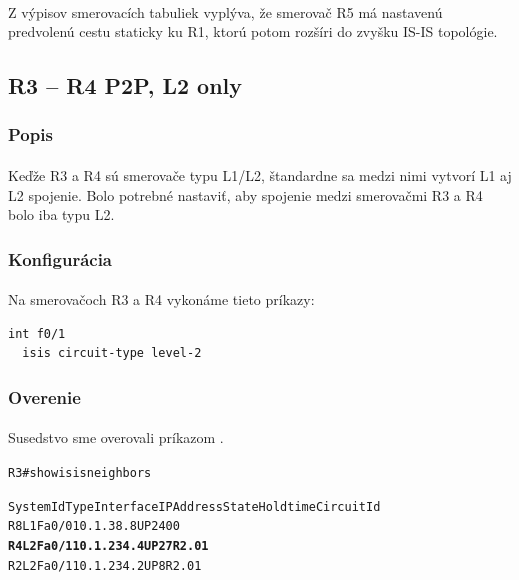 \documentclass[12pt,twoside,a4paper]{report}
\begin{document}
\paragraph{}
Z výpisov smerovacích tabuliek vyplýva, že smerovač R5 má nastavenú predvolenú cestu staticky ku R1, ktorú potom rozšíri do zvyšku IS-IS topológie.





\subsection{R3 – R4 P2P, L2 only}
\subsubsection{Popis}
\paragraph{}
Keďže R3 a R4 sú smerovače typu L1/L2, štandardne sa medzi nimi vytvorí L1 aj L2 spojenie. Bolo potrebné nastaviť, aby spojenie medzi smerovačmi R3 a R4 bolo iba typu L2.

\subsubsection{Konfigurácia}
\paragraph{}
Na smerovačoch R3 a R4 vykonáme tieto príkazy:

\noindent
{\selectfont
\begin{small}
\begin{verbatim}
int f0/1
  isis circuit-type level-2
\end{verbatim}
\end{small}
}

\subsubsection{Overenie}
\paragraph{}
Susedstvo sme overovali príkazom \say{}.

\noindent
{\selectfont
\begin{small}
\begin{alltt}
R3#show isis neighbors

System Id      Type Interface   IP Address      State Holdtime Circuit Id
R8             L1   Fa0/0       10.1.38.8       UP    24       00
\textbf{R4             L2   Fa0/1       10.1.234.4      UP    27       R2.01}
R2             L2   Fa0/1       10.1.234.2      UP    8        R2.01
\end{alltt}
\end{small}
}
\end{document}
